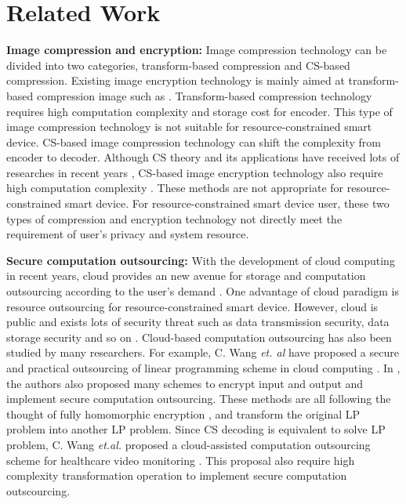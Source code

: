 \documentclass[conference]{IEEEtran}
\begin{document}
\section{Related Work}
\textbf{Image compression and encryption:}
Image compression technology can be divided into two categories, transform-based compression and CS-based compression. Existing image encryption technology is mainly aimed at transform-based compression image such as \cite{chen2010optical,liu2011image,wang2011new}. Transform-based compression technology requires high computation complexity and storage cost for encoder. This type of image compression technology is not suitable for resource-constrained smart device. CS-based image compression technology can shift the complexity from encoder to decoder. Although  CS theory and its applications have received lots of researches in recent years \cite{candes2009lr,needell2009cosamp,chen2014robust,zhang2009spatio,wxb2012energy}, CS-based image encryption technology also require high computation complexity \cite{huang2011robust,zhang2011compressing}. These methods are not  appropriate for resource-constrained smart device.
For resource-constrained smart device user, these two types of compression and encryption technology  not  directly meet the  requirement of user's privacy and system resource.


\textbf{Secure computation outsourcing:}
With the development of cloud computing in recent years, cloud provides an new avenue for storage and  computation outsourcing according to the user's demand \cite{armbrust2010view}. One advantage of cloud paradigm is resource outsourcing for resource-constrained smart device. However, cloud is public and exists lots of security threat such as data transmission security, data storage security and so on \cite{zhang2010cloud,subashini2011survey}. Cloud-based computation outsourcing has also been studied by many researchers. For example,  C. Wang  \emph{et. al} have proposed a secure and practical outsourcing of linear programming scheme in cloud computing \cite{wang2011secure}. In \cite{gennaro2010non,atallah2010securely}, the authors also proposed many schemes to encrypt input and output and implement secure computation outsourcing. These methods are all following the thought of fully homomorphic encryption \cite{gentry2009fully}, and transform the original LP problem into another LP problem. Since CS decoding is equivalent to solve LP problem, C. Wang \emph{et.al.} proposed a cloud-assisted computation outsourcing scheme for healthcare video monitoring \cite{wang2014privacy}. This proposal also require high complexity transformation operation to implement secure computation outscourcing.
\end{document}
